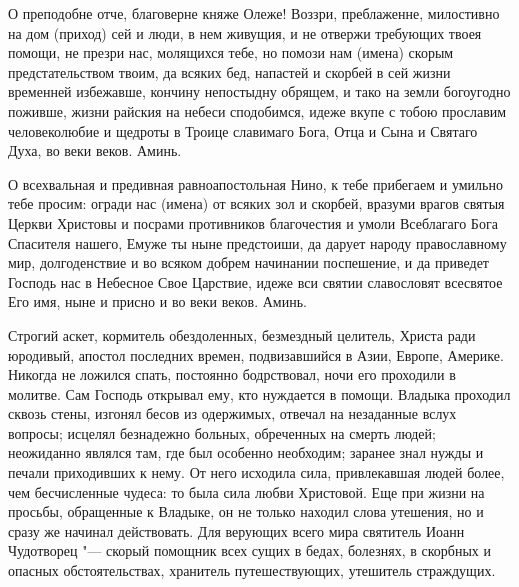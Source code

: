  


О преподобне отче, благоверне княже Олеже! Воззри, преблаженне, милостивно на дом (приход) сей и люди, в нем живущия, и не отвержи требующих твоея помощи, не презри нас, молящихся тебе, но помози нам (имена) скорым предстательством твоим, да всяких бед, напастей и скорбей в сей жизни временней избежавше, кончину непостыдну обрящем, и тако на земли богоугодно поживше, жизни райския на небеси сподобимся, идеже вкупе с тобою прославим человеколюбие и щедроты в Троице славимаго Бога, Отца и Сына и Святаго Духа, во веки веков. Аминь.
\mychapterending

 


О всехвальная и предивная равноапостольная Нино, к тебе прибегаем и умильно тебе просим: огради нас (имена) от всяких зол и скорбей, вразуми врагов святыя Церкви Христовы и посрами противников благочестия и умоли Всеблагаго Бога Спасителя нашего, Емуже ты ныне предстоиши, да дарует народу православному мир, долгоденствие и во всяком добрем начинании поспешение, и да приведет Господь нас в Небесное Свое Царствие, идеже  вси святии славословят всесвятое Его имя, ныне и присно и во веки веков. Аминь.
\mychapterending

 



Строгий аскет, кормитель обездоленных, безмездный целитель, Христа ради юродивый, апостол последних времен, подвизавшийся в Азии, Европе, Америке. Никогда не ложился спать, постоянно бодрствовал, ночи его проходили в молитве. Сам Господь открывал ему, кто нуждается в помощи. Владыка проходил сквозь стены, изгонял бесов из одержимых, отвечал на незаданные вслух вопросы; исцелял безнадежно больных, обреченных на смерть людей; неожиданно являлся там, где был особенно необходим; заранее знал нужды и печали приходивших к нему. От него исходила сила, привлекавшая людей более, чем бесчисленные чудеса: то была сила любви Христовой. Еще при жизни на просьбы, обращенные к Владыке, он не только находил слова утешения, но и сразу же начинал действовать. Для верующих всего мира святитель Иоанн Чудотворец "--- скорый помощник всех сущих в бедах, болезнях, в скорбных и опасных обстоятельствах, хранитель путешествующих, утешитель страждущих.


